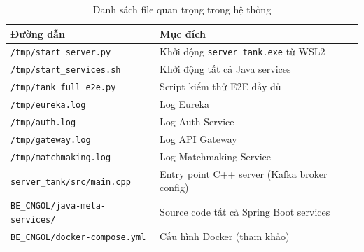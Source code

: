 \documentclass[12pt,a4paper]{report}
\begin{document}
\begin{table}[H]
\centering
\caption{Danh sách file quan trọng trong hệ thống}
\label{tab:filelocations}
\begin{tabularx}{\textwidth}{lX}
\toprule
\textbf{Đường dẫn} & \textbf{Mục đích} \\
\midrule
\texttt{/tmp/start\_server.py}         & Khởi động \texttt{server\_tank.exe} từ WSL2 \\
\texttt{/tmp/start\_services.sh}       & Khởi động tất cả Java services \\
\texttt{/tmp/tank\_full\_e2e.py}       & Script kiểm thử E2E đầy đủ \\
\texttt{/tmp/eureka.log}               & Log Eureka \\
\texttt{/tmp/auth.log}                 & Log Auth Service \\
\texttt{/tmp/gateway.log}              & Log API Gateway \\
\texttt{/tmp/matchmaking.log}          & Log Matchmaking Service \\
\texttt{server\_tank/src/main.cpp}     & Entry point C++ server (Kafka broker config) \\
\texttt{BE\_CNGOL/java-meta-services/} & Source code tất cả Spring Boot services \\
\texttt{BE\_CNGOL/docker-compose.yml}  & Cấu hình Docker (tham khảo) \\
\bottomrule
\end{tabularx}
\end{table}
\end{document}
